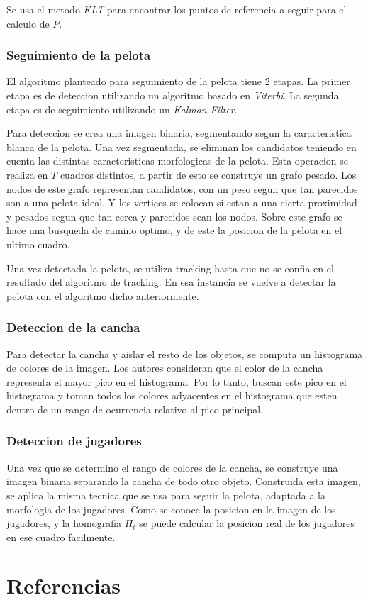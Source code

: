 \documentclass[a4paper,10pt]{article}
\begin{document}
Se usa el metodo \textit{KLT} \cite{KLT} para encontrar los puntos de referencia a seguir para el calculo de $P$.

\subsubsection*{Seguimiento de la pelota}

El algoritmo planteado para seguimiento de la pelota tiene 2 etapas.
La primer etapa es de deteccion utilizando un algoritmo basado en \textit{Viterbi}.
La segunda etapa es de seguimiento utilizando un \textit{Kalman Filter}.

Para deteccion se crea una imagen binaria, segmentando segun la caracteristica blanca de la pelota.
Una vez segmentada, se eliminan los candidatos teniendo en cuenta las distintas caracteristicas morfologicas de la pelota. 
Esta operacion se realiza en $T$ cuadros distintos, a partir de esto se construye un grafo pesado.
Los nodos de este grafo representan candidatos, con un peso segun que tan parecidos son a una pelota ideal.
Y los vertices se colocan si estan a una cierta proximidad y pesados segun que tan cerca y parecidos sean los nodos.
Sobre este grafo se hace una busqueda de camino optimo, y de este la posicion de la pelota en el ultimo cuadro.

Una vez detectada la pelota, se utiliza tracking hasta que no se confia en el resultado del algoritmo de tracking.
En esa instancia se vuelve a detectar la pelota con el algoritmo dicho anteriormente.

\subsubsection*{Deteccion de la cancha}

Para detectar la cancha y aislar el resto de los objetos, se computa un histograma de colores de la imagen.
Los autores consideran que el color de la cancha representa el mayor pico en el histograma.
Por lo tanto, buscan este pico en el histograma y toman todos los colores adyacentes en el histograma que esten dentro de un rango de ocurrencia relativo al pico principal.

\subsubsection*{Deteccion de jugadores}

Una vez que se determino el rango de colores de la cancha, se construye una imagen binaria separando la cancha de todo otro objeto.
Construida esta imagen, se aplica la misma tecnica que se usa para seguir la pelota, adaptada a la morfologia de los jugadores.
Como se conoce la posicion en la imagen de los jugadores, y la homografia $H_t$ se puede calcular la posicion real de los jugadores en ese cuadro facilmente.



\section*{Referencias}
\printbibliography
\end{document}
